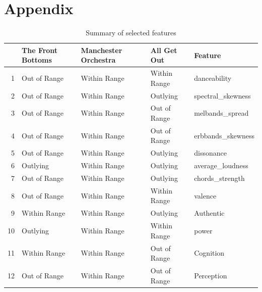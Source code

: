 \documentclass{article}\usepackage[]{graphicx}\usepackage[]{xcolor}
\begin{document}
\newpage
\onecolumn
\section{Appendix}
\begin{table}[ht]
\centering
\begin{tabular}{rllll}
  \hline
 & The Front Bottoms & Manchester Orchestra & All Get Out & Feature \\ 
  \hline
1 & Out of Range & Within Range & Within Range & danceability \\ 
  2 & Out of Range & Within Range & Outlying & spectral\_skewness \\ 
  3 & Out of Range & Within Range & Out of Range & melbands\_spread \\ 
  4 & Out of Range & Within Range & Out of Range & erbbands\_skewness \\ 
  5 & Out of Range & Within Range & Outlying & dissonance \\ 
  6 & Outlying & Within Range & Outlying & average\_loudness \\ 
  7 & Out of Range & Within Range & Outlying & chords\_strength \\ 
  8 & Out of Range & Within Range & Within Range & valence \\ 
  9 & Within Range & Within Range & Outlying & Authentic \\ 
  10 & Outlying & Within Range & Within Range & power \\ 
  11 & Within Range & Within Range & Out of Range & Cognition \\ 
  12 & Out of Range & Within Range & Out of Range & Perception \\ 
   \hline
\end{tabular}
\caption{Summary of selected features}
\end{table}
\end{document}
